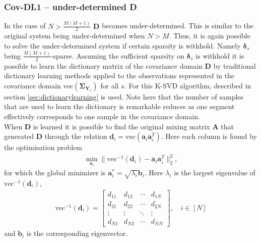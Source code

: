 \subsubsection*{Cov-DL1 -- under-determined \textbf{D}}
In the case of $N > \frac{M(M+1)}{2}$ $\textbf{D}$ becomes under-determined. This is  similar to the original system being under-determined when $N>M$. 
Thus, it is again possible to solve the under-determined system if certain sparsity is withhold. Namely $\boldsymbol{\delta}_s$ being $\frac{M(M+1)}{2}$-sparse.
Assuming the sufficient sparsity on $\boldsymbol{\delta}_s$ is withhold it is possible to learn the dictionary matrix of the covariance domain $\mathbf{D}$ by traditional dictionary learning methods applied to the observations represented in the covariance domain $\text{vec}(\boldsymbol{\Sigma}_{\mathbf{Y}_s})$ for all $s$.
For this K-SVD algorithm, described in section \ref{sec:dictionarylearning} is used. 
Note here that the number of samples that are used to learn the dictionary is remarkable reduces as one segment effectively corresponds to one sample in the covariance domain.  \\ 
When $\mathbf{D}$ is learned it is possible to find the original mixing matrix $\mathbf{A}$ that generated $\textbf{D}$ through the relation $\mathbf{d}_i = \text{vec}(\mathbf{a}_i \mathbf{a}_i^T)$. Here each column is found by the optimisation problem 
\begin{align*}
\min_{\textbf{a}_i} \| \text{vec}^{-1}(\textbf{d}_i) -\textbf{a}_i\textbf{a}_i^T\|_2^2, 
\end{align*}
for which the global minimizer is $\mathbf{a}^{\ast}_i=\sqrt{\lambda_i} \textbf{b}_i$. Here $\lambda_i$ is the largest eigenvalue of $\text{vec}^{-1}(\textbf{d}_i)$,
\begin{align*}
\text{vec}^{-1}(\textbf{d}_i) = 
\begin{bmatrix}
d_{11} & d_{12} & \cdots & d_{1N} \\
d_{21} & d_{22} & \cdots & d_{2N} \\
\vdots & \vdots & \ddots & \vdots \\
d_{N1} & d_{N2} & \cdots & d_{NN}
\end{bmatrix}, \quad i \in [N]
\end{align*}
and $\textbf{b}_i$ is the corresponding eigenvector.
  
